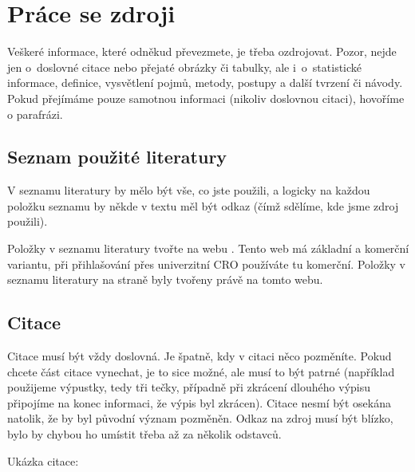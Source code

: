 \section{Práce se zdroji}

Veškeré informace, které odněkud převezmete, je třeba ozdrojovat. Pozor, nejde jen o~doslovné citace nebo přejaté obrázky či tabulky, ale i~o~statistické informace, definice, vysvětlení pojmů, metody, postupy a další tvrzení či návody. Pokud přejímáme pouze samotnou informaci (nikoliv doslovnou citaci), hovoříme o parafrázi.

\subsection{Seznam použité literatury}

V seznamu literatury by mělo být vše, co jste použili, a logicky na každou položku seznamu by někde v textu měl být odkaz (čímž sdělíme, kde jsme zdroj použili).

Položky v seznamu literatury tvořte na webu \cite{generatorcitaci}. Tento web má základní a komerční variantu, při přihlašování přes univerzitní CRO používáte tu komerční. Položky v seznamu literatury na straně \pageref{chap:literatura} byly tvořeny právě na tomto webu.



\subsection{Citace}

Citace musí být vždy doslovná. Je špatně, kdy v citaci něco pozměníte. Pokud chcete část citace vynechat, je to sice možné, ale musí to být patrné (například použijeme výpustky, tedy tři tečky, případně při zkrácení dlouhého výpisu připojíme na konec informaci, že výpis byl zkrácen). Citace nesmí být osekána natolik, že by byl původní význam pozměněn. Odkaz na zdroj musí být blízko, bylo by chybou ho umístit třeba až za několik odstavců.

Ukázka citace:
\bigskip


\cite{autorskepravo}
\bigskip

